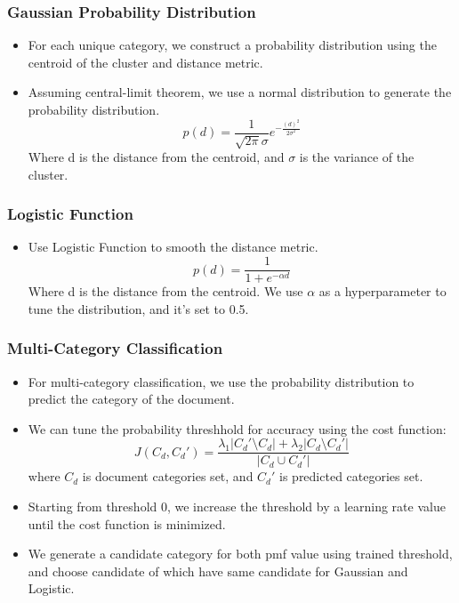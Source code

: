 \documentclass[
  10pt %
  16:9, %
]{beamer}
\begin{document}
\begin{frame}
  \frametitle{Gaussian Probability Distribution}
  \begin{itemize}
    \item For each unique category, we construct a probability distribution using the centroid of the cluster and distance metric.
    \item Assuming central-limit theorem, we use a normal distribution to generate the probability distribution.
    \[
      p(d) = \frac{1}{\sqrt{2\pi}\sigma}e^{-\frac{(d)^2}{2\sigma^2}}
    \]
    Where d is the distance from the centroid, and \(\sigma\) is the variance of the cluster.
  \end{itemize}
\end{frame}

\begin{frame}
  \frametitle{Logistic Function}
  \begin{itemize}
    \item Use Logistic Function to smooth the distance metric.
    \[
      p(d) = \frac{1}{1+e^{-\alpha d}}
    \]
    Where d is the distance from the centroid. We use $\alpha$ as a hyperparameter to tune the distribution, and it's set to 0.5.
  \end{itemize}
\end{frame}

\begin{frame}
  \frametitle{Multi-Category Classification}
  \begin{itemize}
    \item For multi-category classification, we use the probability distribution to predict the category of the document.
    \item We can tune the probability threshhold for accuracy using the cost function:
    \[
      J(C_d, C_d') = \frac{\lambda_1|C_d'\setminus C_d| + \lambda_2|C_d\setminus C_d'|}{|C_d\cup C_d'|}
    \]
    where $C_d$ is document categories set, and $C_d'$ is predicted categories set.
    \item Starting from threshold 0, we increase the threshold by a learning rate value until the cost function is minimized.
    \item We generate a candidate category for both pmf value using trained threshold, and choose candidate of which have same candidate for Gaussian and Logistic.
  \end{itemize}
\end{frame}
\end{document}
